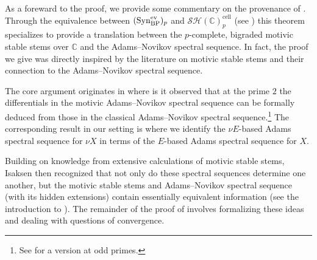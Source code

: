 \begin{rmk}
  As a foreward to the proof, we provide some commentary on the provenance of .
  Through the equivalence between $(\mathrm{Syn}_{\mathrm{BP}}^{\mathrm{ev}})_p$ and $\mathcal{SH}(\mathbb{C})_p^{\mathrm{cell}}$ (see \cite[Theorem 1.4]{Pstragowski}) this theorem specializes to provide a translation between the $p$-complete, bigraded motivic stable stems over $\mathbb{C}$ and the Adams--Novikov spectral sequence.
  In fact, the proof we give was directly inspired by the literature on motivic stable stems and their connection to the Adams--Novikov spectral sequence.

  The core argument originates in \cite[Lemma 15]{HKO} where is it observed that at the prime $2$ the differentials in the motivic Adams--Novikov spectral sequence can be formally deduced from those in the classical Adams--Novikov spectral sequence.\footnote{See \cite[Proposition 5.6]{Stahn} for a version at odd primes.} The corresponding result in our setting is  where we identify the $\nu E$-based Adams spectral sequence for $\nu X$ in terms of the $E$-based Adams spectral sequence for $X$.

  Building on knowledge from extensive calculations of motivic stable stems, Isaksen then recognized that not only do these spectral sequences determine one another, but the motivic stable stems and Adams--Novikov spectral sequence (with its hidden extensions) contain essentially equivalent information (see the introduction to \cite[Chapter 6]{StableStems}). The remainder of the proof of  involves formalizing these ideas and dealing with questions of convergence.
\end{rmk}

